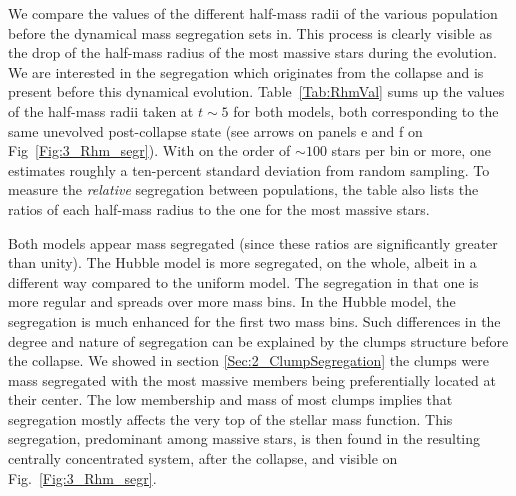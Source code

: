 %


We compare the values of the different half-mass radii of the various population before the dynamical mass segregation sets in. This process is clearly visible as the drop of the half-mass radius of the most massive stars during the evolution. We are interested in the segregation which originates from the collapse and is present before this dynamical evolution. Table~\ref{Tab:RhmVal} sums up the values of the half-mass radii taken at $t\sim5$ for both models, both corresponding to the same unevolved post-collapse state (see arrows on panels e and f on Fig~\ref{Fig:3_Rhm_segr}). With on the order of $\sim 100$ stars per bin or more, one estimates roughly a ten-percent standard deviation from random sampling. To measure the \textit{relative} segregation between populations, the table also lists the ratios of each half-mass radius to the one for the most massive stars. 

Both models appear mass segregated (since these ratios are significantly greater than unity). The Hubble model is more segregated, on the whole, albeit in a different way compared to the uniform model. The segregation in that one is more regular and spreads over more mass bins. In the Hubble model, the segregation is much enhanced for the first two mass bins. Such differences in the degree and nature of segregation can be explained by the clumps structure before the collapse. We showed in section \ref{Sec:2_ClumpSegregation} the clumps were mass segregated with the most massive members being preferentially located at their center. The low membership and mass of most clumps implies that segregation mostly affects the very top of the stellar mass function. This segregation, predominant among massive stars, is then found in the resulting centrally concentrated system, after the collapse, and visible on Fig.~\ref{Fig:3_Rhm_segr}. 

